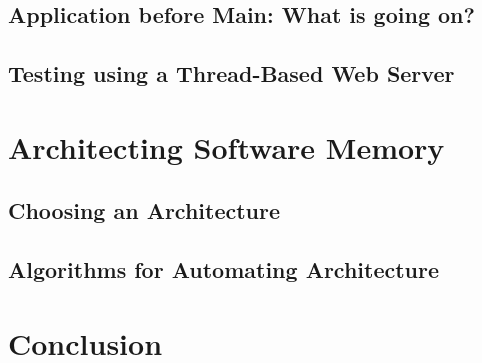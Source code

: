 \documentclass[a4paper, 12pt]{article}
\begin{document}
\subsection{Application before Main: What is going on?}
 
\subsection{Testing using a Thread-Based Web Server}


\section{Architecting Software Memory}

\subsection{Choosing an Architecture}

\subsection{Algorithms for Automating Architecture}

\section{Conclusion}

\newpage
{}


\end{document}
